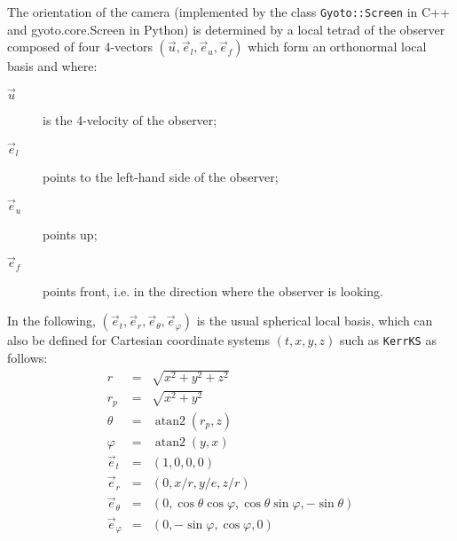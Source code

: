 \documentclass[a4paper,12pt]{article}
\DeclareMathOperator{\atantwo}{atan2}
\begin{document}
The orientation of the camera (implemented by the class
\texttt{Gyoto::Screen} in C++ and gyoto.core.Screen in Python) is
determined by a local tetrad of the observer composed of four 4-vectors
$(\vec u, \vec e_l, \vec e_u, \vec e_f)$ which form an orthonormal
local basis and where:
\begin{description}
\item[$\vec u$] is the 4-velocity of the observer;
\item[$\vec e_l$] points to the left-hand side of the observer;
\item[$\vec e_u$] points up;
\item[$\vec e_f$] points front, i.e. in the direction where the
  observer is looking.
\end{description}

In the following, $(\vec e_t, \vec e_r, \vec e_\theta, \vec
e_\varphi)$ is the usual spherical local basis, which can also be
defined for Cartesian coordinate systems $(t, x, y, z)$ such as
\texttt{KerrKS} as follows:
$$
\begin{array}{rcl}
  r & = & \sqrt{x^2+y^2+z^2} \\
  r_p & = & \sqrt{x^2+y^2} \\
  \theta & = & \atantwo(r_p, z) \\
  \varphi & = & \atantwo(y, x) \\
  \vec e_t & = & (1, 0, 0, 0) \\
  \vec e_r & = &  (0, x/r, y/e, z/r) \\
  \vec e_\theta & = &  (0, \cos \theta \cos \varphi, \cos \theta \sin\varphi, -\sin \theta)\\
  \vec e_\varphi & = & (0, -\sin \varphi, \cos \varphi, 0)  \\
\end{array}
$$
\end{document}
